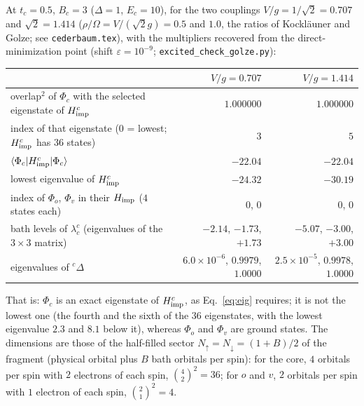 \documentclass[11pt]{article}
\newcommand{\braket}[1]{\langle #1\rangle}
\begin{document}
At $t_c=0.5$, $B_c=3$ ($\Delta=1$, $E_c=10$), for the two couplings $V/g=1/\sqrt2=0.707$ and $\sqrt2=1.414$ ($\rho/\Omega=V/(\sqrt2g)=0.5$ and $1.0$, the ratios of Kockl\"auner and Golze;
see \texttt{cederbaum.tex}), with the multipliers recovered from the direct-minimization point (shift $\varepsilon=10^{-9}$;
\texttt{excited\_check\_golze.py}):
\begin{center}\footnotesize
\begin{tabular}{p{7.6cm} rr}
\toprule
 & $V/g=0.707$ & $V/g=1.414$\\
\midrule
overlap$^2$ of $\Phi_c$ with the selected eigenstate of $H^c_{\rm imp}$ & $1.000000$ & $1.000000$\\
index of that eigenstate (0 = lowest; $H^c_{\rm imp}$ has $36$ states) & $3$ & $5$\\
$\braket{\Phi_c|H^c_{\rm imp}|\Phi_c}$ & $-22.04$ & $-22.04$\\
lowest eigenvalue of $H^c_{\rm imp}$ & $-24.32$ & $-30.19$\\
index of $\Phi_o$, $\Phi_v$ in their $H_{\rm imp}$ ($4$ states each) & $0$, $0$ & $0$, $0$\\
bath levels of $\lambda^c_c$ (eigenvalues of the $3\times3$ matrix) & $-2.14$, $-1.73$, $+1.73$ & $-5.07$, $-3.00$, $+3.00$\\
eigenvalues of ${}^c\Delta$ & $6.0\times10^{-6}$, $0.9979$, $1.0000$ & $2.5\times10^{-5}$, $0.9978$, $1.0000$\\
\bottomrule
\end{tabular}
\end{center}
That is: $\Phi_c$ is an exact eigenstate of $H^c_{\rm imp}$, as Eq.~\eqref{eq:eig} requires; it is not the lowest one (the fourth and the sixth of the $36$ eigenstates, with the
lowest eigenvalue $2.3$ and $8.1$ below it), whereas $\Phi_o$ and $\Phi_v$ are ground states. The dimensions are those of the half-filled sector $N_\uparrow=N_\downarrow=(1+B)/2$ of the fragment (physical orbital plus $B$ bath orbitals per spin):
for the core, $4$ orbitals per spin with $2$ electrons of each spin, $\binom42^2=36$; for $o$ and $v$, $2$ orbitals per spin with $1$ electron of each spin, $\binom21^2=4$.
\end{document}
